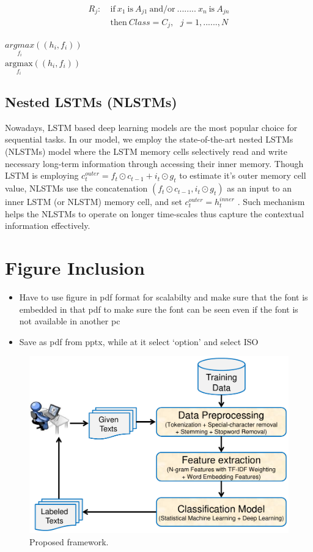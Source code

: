 \documentclass[11pt]{article}
\begin{document}
\begin{equation*}
\begin{split}
R_j: & \ \mbox{if}\ x_1\ \mbox{is}\ A_{j1}\ \mbox{and/or}\ ........\ x_n\ \mbox{is}\ A_{jn} \\
     & \ \mbox{then}\ Class = C_j, \ \ \ j=1, ......,N     
\end{split}
\end{equation*}

$\underset{f_i}{argmax} ((h_i, f_i))$ \\
$\underset{f_i}{\mbox{argmax}} ((h_i, f_i))$

\subsection{Nested LSTMs (NLSTMs)}
\label{ref:nestedLSTMs}
Nowadays, LSTM based deep learning models are the most popular choice for sequential tasks. In our model, we employ the state-of-the-art nested LSTMs (NLSTMs) model where the LSTM memory cells selectively read and write necessary long-term information through accessing their inner memory. Though LSTM is employing $c_t^{outer}={f_{t}}\odot{c_{t-1}+i_t}\odot{g_{t}}$ to estimate it’s outer memory cell value, NLSTMs use the concatenation $(f_t\odot{c_{t-1}},i_t\odot{g_t}) $ as an input to an inner LSTM (or NLSTM) memory cell, and set $c_t^{outer}=h_t^{inner} $ . Such mechanism helps the NLSTMs to operate on longer time-scales thus capture the
contextual information effectively.

\section{Figure Inclusion}
\label{ref:figure}

\begin{itemize}
\item Have to use figure in pdf format for scalabilty and make sure that the font is embedded in that pdf to make sure the font can be seen even if the font is not available in another pc
\item Save as pdf from pptx, while at it select `option' and select ISO
\end{itemize}


\begin{figure}[!h] %
\centering %
\includegraphics[width=0.7\linewidth]{ExampleSlide.pdf}
\caption{Proposed framework.}
\label{fig:overview}
\end{figure}
\end{document}
